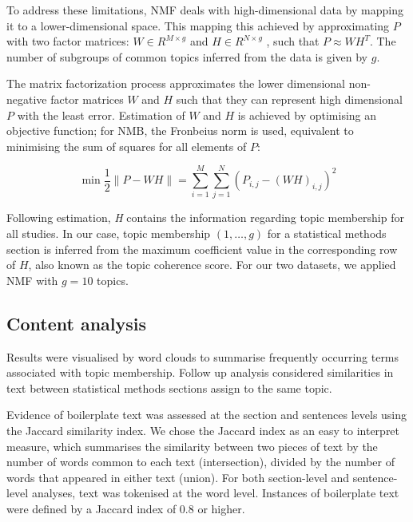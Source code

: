 \documentclass[12pt]{article}
\begin{document}
To address these limitations, NMF deals with high-dimensional data by
mapping it to a lower-dimensional space. This mapping this achieved by
approximating \(P\) with two factor matrices: \(W \in R^{M \times g}\)
and \(H \in R ^{N \times g}\) \citep{aggarwal2012mining}, such that
\(P \approx WH^{T}\). The number of subgroups of common topics inferred
from the data is given by \(g\).

The matrix factorization process approximates the lower dimensional
non-negative factor matrices \(W\) and \(H\) such that they can
represent high dimensional \(P\) with the least error. Estimation of
\(W\) and \(H\) is achieved by optimising an objective function; for
NMB, the Fronbeius norm is used, equivalent to minimising the sum of
squares for all elements of \(P\):

\begin{equation}
\label{eq:NMFobjectivefn}
\min \frac{1}{2}\|P - WH\|= \sum _{i=1}^{M}\sum _{j=1}^{N} \left(  P_{i,j} -\left(WH \right)_{i,j} \right)^{2}
\end{equation}

Following estimation, \textit{H} contains the information regarding
topic membership for all studies. In our case, topic membership
\((1,\ldots,g)\) for a statistical methods section is inferred from the
maximum coefficient value in the corresponding row of \(H\), also known
as the topic coherence score. For our two datasets, we applied NMF with
\(g=10\) topics.

\subsection{Content analysis}

Results were visualised by word clouds to summarise
frequently occurring terms associated with topic membership. Follow up analysis considered 
similarities in text between statistical methods sections assign to the same topic.

Evidence of boilerplate text was assessed at the section and sentences levels using the Jaccard similarity index. 
We chose the Jaccard index as an easy to interpret measure, which summarises the similarity between two pieces of text by the
number of words common to each text (intersection), divided by the
number of words that appeared in either text (union). For both section-level and sentence-level analyses, text was tokenised at the word level. 
Instances of boilerplate text were defined by a Jaccard index of 0.8 or higher.
\end{document}
